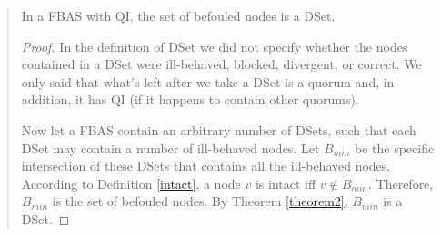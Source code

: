 \begin{quote}
\small
\begin{theorem}
\label{theorem3}
In a FBAS with QI, the set of befouled nodes is a DSet.
\end{theorem}
\begin{proof}
In the definition of DSet we did not specify whether the nodes contained in a DSet were ill-behaved, blocked, divergent, or correct. We only said that what's left after we take a DSet is a quorum and, in addition, it has QI (if it happens to contain other quorums).

\vspace{0.3cm}
Now let a FBAS contain an arbitrary number of DSets, such that each DSet may contain a number of ill-behaved nodes. Let $B_{min}$ be the specific intersection of these DSets that contains all the ill-behaved nodes. According to Definition \ref{intact}, a node $v$ is intact iff $v \notin B_{min}$. Therefore, $B_{min}$ is the set of befouled nodes. By Theorem \ref{theorem2}, $B_{min}$ is a DSet.
\end{proof}
\end{quote}











